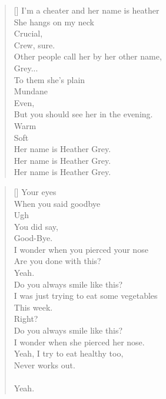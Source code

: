 \documentclass{article}
\begin{document}
\newpage

\settowidth{\versewidth}{Than Tycho Brahe, or Erra Pater:}
\begin{verse}[\versewidth]
I’m a cheater and her name is heather \\
She hangs on my neck \\
Crucial, \\
Crew, sure. \\
Other people call her by her other name, \\
Grey... \\
To them she's plain \\
Mundane \\
Even, \\
But you should see her in the evening. \\
Warm \\
Soft \\
Her name is Heather Grey. \\
Her name is Heather Grey. \\
Her name is Heather Grey. \\
\end{verse}

\settowidth{\versewidth}{Than Tycho Brahe, or Erra Pater:}
\begin{verse}[\versewidth]
Your eyes \\
When you said goodbye \\
Ugh \\
You did say, \\
Good-Bye. \\
I wonder when you pierced your nose \\
Are you done with this? \\
Yeah. \\
Do you always smile like this? \\
I was just trying to eat some vegetables \\
This week. \\
Right? \\
Do you always smile like this? \\
I wonder when she pierced her nose. \\
Yeah, I try to eat healthy too, \\
Never works out. \\
\\
Yeah. \\
\end{verse}

\newpage
\end{document}

